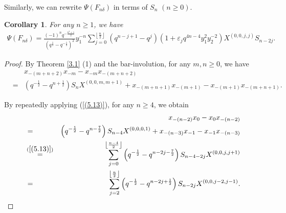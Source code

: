 \documentclass[reqno,11pt]{amsart}
\numberwithin{equation}{section}
\newtheorem{corollary}[theorem]{Corollary}
\begin{document}
Similarly, we can rewrite $\Psi \left( {{F_{n\delta }}} \right)$ in terms of $S_n$ $(n\geq 0)$.
\begin{corollary}\label{5.7}
	For any $n\ge 1$, we have
	\begin{eqnarray*}
		\Psi \left( {{F_{n\delta }}} \right)	= \frac{{{{( - 1)}^n}{q^{ - \frac{{{n^2} + 1}}{2}}}}}{{{{\left( {{q^{\frac{1}{2}}} - {q^{ - \frac{1}{2}}}} \right)}^2}}}y_1^{ - n}\sum\limits_{j = 0}^{\left\lfloor {\frac{n}{2}} \right\rfloor }{\left( {{q^{n - j + 1}} - {q^j}} \right)\left( {1 + {\varepsilon _j}{q^{4n - 4}}y_1^2y_2^{ - 2}} \right){X^{(0,0,j,j)}}{S_{n - 2j}}}.
	\end{eqnarray*}
\end{corollary}

\begin{proof}
	By Theorem \ref{3.1} (1) and the bar-involution,
	for any $m,n\ge 0$, we have
	\begin{eqnarray}\label{(5.13)}
		&&x_{-(m+n+2)}x_{-m}-x_{-m}x_{-(m+n+2)}\nonumber\\
		&=&\left(q^{-\frac12}-q^{n+\frac12}\right)S_nX^{(0,0,m,m+1)}+x_{-(m+n+1)}x_{-(m+1)}-x_{-(m+1)}x_{-(m+n+1)}.
	\end{eqnarray}
	
	By repeatedly applying (\ref{(5.13)}),
	for any $n\ge 4$, we obtain
	\begin{eqnarray*}
		&&x_{-(n-2)}x_0-x_0x_{-(n-2)}\\
		&=&\left(q^{-\frac12}-q^{n-\frac72}\right)S_{n-4}X^{(0,0,0,1)}+x_{-(n-3)}x_{-1}-x_{-1}x_{-(n-3)}\\
		&\mathop =\limits^{(\ref{(5.13)})}&\sum\limits_{j=0}^{\left\lfloor\frac{n-4}{2}\right\rfloor}\left(q^{-\frac12}-q^{n-2j-\frac72}\right)S_{n-4-2j}X^{(0,0,j,j+1)}\\
		&=&\sum\limits_{j=2}^{\left\lfloor\frac n2\right\rfloor}\left(q^{-\frac12}-q^{n-2j+\frac12}\right)S_{n-2j}X^{(0,0,j-2,j-1)}.
	\end{eqnarray*}
	

\end{proof}
\end{document}
